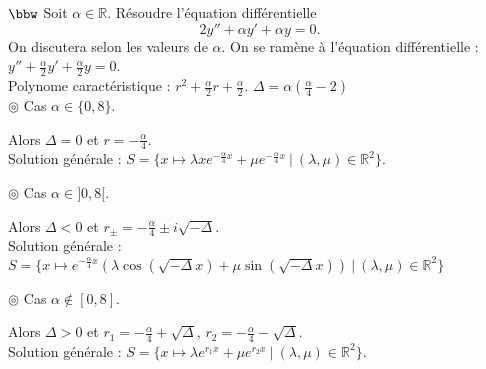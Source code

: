\documentclass[11pt]{article}
\begin{document}
\begin{exercice}{$\bbw$}{}
    Soit $\alpha\in\mathbb{R}$. Résoudre l'équation différentielle
    \begin{equation*}
        2y'' + \alpha y' + \alpha y = 0.
    \end{equation*}
    On discutera selon les valeurs de $\alpha$.
    \tcblower
    On se ramène à l'équation différentielle : $y'' + \frac{\alpha}{2}y' + \frac{\alpha}{2}y = 0$.\\
    Polynome caractéristique : $r^2 + \frac{\alpha}{2}r + \frac{\alpha}{2}$. $\Delta=\alpha(\frac{\alpha}{4}-2)$\\
    $\circledcirc$ Cas $\alpha\in\{0, 8\}$.
    \begin{adjustwidth}{1cm}{}
        Alors $\Delta=0$ et $r=-\frac{\alpha}{4}$.\\
        Solution générale : $S = \{x\mapsto \lambda x e^{-\frac{\alpha}{4}x} + \mu e^{-\frac{\alpha}{4}x} ~ | ~ (\lambda, \mu)\in\mathbb{R}^2\}$.
    \end{adjustwidth}
    $\circledcirc$ Cas $\alpha\in]0,8[$.
    \begin{adjustwidth}{1cm}{}
        Alors $\Delta<0$ et $r_\pm = -\frac{\alpha}{4} \pm i\sqrt{-\Delta}$.\\
        Solution générale : $S = \{x\mapsto e^{-\frac{\alpha}{4}x} \left( \lambda \cos(\sqrt{-\Delta}x) + \mu\sin(\sqrt{-\Delta}x) \right) ~ | ~  (\lambda,\mu)\in\mathbb{R}^2\}$
    \end{adjustwidth}
    $\circledcirc$ Cas $\alpha\notin[0,8]$.
    \begin{adjustwidth}{1cm}{}
        Alors $\Delta>0$ et $r_1 = -\frac{\alpha}{4} + \sqrt{\Delta}$, $r_2 = -\frac{\alpha}{4} - \sqrt{\Delta}$.\\
        Solution générale : $S=\{x\mapsto \lambda e^{r_1x} + \mu e^{r_2x} ~ | ~ (\lambda,\mu)\in\mathbb{R}^2\}$.
    \end{adjustwidth}
\end{exercice}
\end{document}
